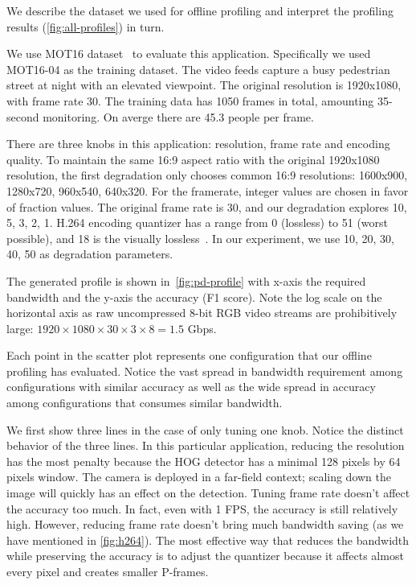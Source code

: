 We describe the dataset we used for offline profiling and interpret the
profiling results (\autoref{fig:all-profiles}) in turn.

 We use MOT16 dataset~\cite{milan2016mot16} to
evaluate this application. Specifically we used MOT16-04 as the training
dataset. The video feeds capture a busy pedestrian street at night with an
elevated viewpoint. The original resolution is 1920x1080, with frame rate
30. The training data has 1050 frames in total, amounting 35-second monitoring.
On averge there are 45.3 people per frame.

There are three knobs in this application: resolution, frame rate and encoding
quality. To maintain the same 16:9 aspect ratio with the original 1920x1080
resolution, the first degradation only chooses common 16:9 resolutions:
1600x900, 1280x720, 960x540, 640x320. For the framerate, integer values are
chosen in favor of fraction values. The original frame rate is 30, and our
degradation explores 10, 5, 3, 2, 1. H.264 encoding quantizer has a range from 0
(lossless) to 51 (worst possible), and 18 is the visually
lossless~\cite{bellard2012ffmpeg}. In our experiment, we use 10, 20, 30, 40, 50
as degradation parameters.

The generated profile is shown in~\autoref{fig:pd-profile} with x-axis the
required bandwidth and the y-axis the accuracy (F1 score). Note the log scale on
the horizontal axis as raw uncompressed 8-bit RGB video streams are
prohibitively large: $1920 \times 1080 \times 30 \times 3 \times 8 = 1.5 $ Gbps.

Each point in the scatter plot represents one configuration that our offline
profiling has evaluated. Notice the vast spread in bandwidth requirement among
configurations with similar accuracy as well as the wide spread in accuracy
among configurations that consumes similar bandwidth.

We first show three lines in the case of only tuning one knob. Notice the
distinct behavior of the three lines. In this particular application, reducing
the resolution has the most penalty because the HOG detector has a minimal 128
pixels by 64 pixels window. The camera is deployed in a far-field context;
scaling down the image will quickly has an effect on the detection. Tuning frame
rate doesn't affect the accuracy too much. In fact, even with 1 FPS, the
accuracy is still relatively high. However, reducing frame rate doesn't bring
much bandwidth saving (as we have mentioned in \autoref{fig:h264}).  The most
effective way that reduces the bandwidth while preserving the accuracy is to
adjust the quantizer because it affects almost every pixel and creates smaller
P-frames.

